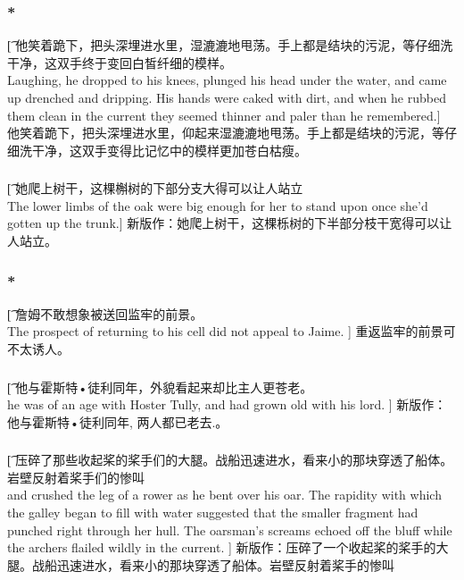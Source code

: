 \documentclass[12pt,a4paper]{article}
\begin{document}
\subsubsection{\color{red}*}\t[
	他笑着跪下，把头深埋进水里，湿漉漉地甩荡。手上都是结块的污泥，等仔细洗干净，这双手终于变回白皙纤细的模样。\\
	Laughing, he dropped to his knees, plunged his head under the water, and came up drenched and dripping. His hands were caked with dirt, and when he rubbed them clean in the current they seemed thinner and paler than he remembered.]
	他笑着跪下，把头深埋进水里，仰起来湿漉漉地甩荡。手上都是结块的污泥，等仔细洗干净，这双手变得比记忆中的模样更加苍白枯瘦。
	
\subsubsection{}\t[
	她爬上树干，这棵槲树的下部分支大得可以让人站立\\
	The lower limbs of the oak were big enough for her to stand upon once she'd gotten up the trunk.]
	新版作：她爬上树干，这棵栎树的下半部分枝干宽得可以让人站立。
	
\subsubsection{\color{red}*}\t[	
	詹姆不敢想象被送回监牢的前景。\\
	The prospect of returning to his cell did not appeal to Jaime. ]
	重返监牢的前景可不太诱人。
	
\subsubsection{}\t[
	他与霍斯特•徒利同年，外貌看起来却比主人更苍老。\\
	he was of an age with Hoster Tully, and had grown old with his lord. ]
	新版作：他与霍斯特•徒利同年, 两人都已老去.。
	
\subsubsection{}\t[
	压碎了那些收起桨的桨手们的大腿。战船迅速进水，看来小的那块穿透了船体。岩壁反射着桨手们的惨叫\\
	and crushed the leg of a rower as he bent over his oar. The rapidity with which the galley began to fill with water suggested that the smaller fragment had punched right through her hull. The oarsman's screams echoed off the bluff while the archers flailed wildly in the current. ]
	新版作：压碎了一个收起桨的桨手的大腿。战船迅速进水，看来小的那块穿透了船体。岩壁反射着桨手的惨叫
	
\end{document}
